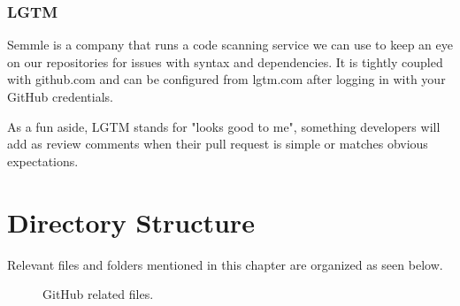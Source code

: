 \subsubsection{LGTM}

Semmle is a company that runs a code scanning service we can use to keep
an eye on our repositories for issues with syntax and dependencies. It
is tightly coupled with github.com and can be configured from lgtm.com
after logging in with your GitHub credentials.

\justify
As a fun aside, LGTM stands for "looks good to me", something developers
will add as review comments when their pull request is simple or matches
obvious expectations.

\clearpage


\section{Directory Structure}

Relevant files and folders mentioned in this chapter are organized as
seen below.

\begin{figure}[!htb]
   \centering
   
   \caption{GitHub related files.}
\end{figure}
